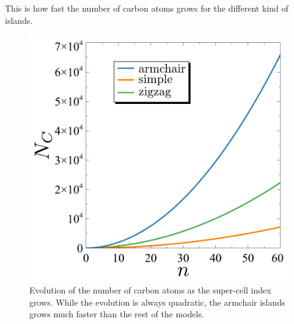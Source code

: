 This is how fast the number of carbon atoms grows for the different kind of islands.

\begin{figure}[h!]
\centering
\includegraphics{appendix/figures/Nats.pdf}
\vspace{-5pt}
\caption{Evolution of the number of carbon atoms as the super-cell index grows. While the evolution is always quadratic, the armchair islands grows much faster than the rest of the models.}
\label{Nats}
\end{figure}
\FloatBarrier
